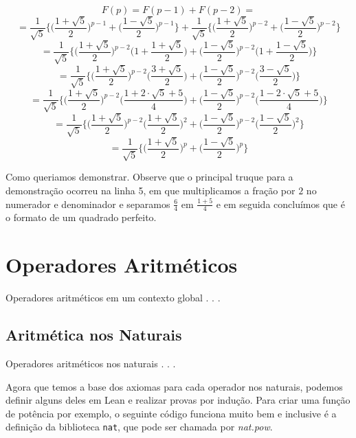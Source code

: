 \begin{center}
    \[ F(p) = F(p-1) + F(p-2) = \]
    \[ = \frac{1}{\sqrt{5}}\bigg \{ \Big (\frac{1+\sqrt{5}}{2} \Big )^{p-1} + \Big (\frac{1-\sqrt{5}}{2}\Big )^{p-1}\bigg \} + \frac{1}{\sqrt{5}}\bigg \{ \Big (\frac{1+\sqrt{5}}{2} \Big )^{p-2} + \Big (\frac{1-\sqrt{5}}{2}\Big )^{p-2}\bigg \}\]
    \[ = \frac{1}{\sqrt{5}}\bigg \{ \Big (\frac{1+\sqrt{5}}{2} \Big )^{p-2} \Big( 1 + \frac{1+\sqrt{5}}{2}\Big) + \Big (\frac{1-\sqrt{5}}{2}\Big )^{p-2} \Big( 1 +\frac{1 - \sqrt{5}}{2}\Big)\bigg \}\]
    \[ = \frac{1}{\sqrt{5}}\bigg \{ \Big (\frac{1+\sqrt{5}}{2} \Big )^{p-2} \Big( \frac{3+\sqrt{5}}{2}\Big) + \Big (\frac{1-\sqrt{5}}{2}\Big )^{p-2} \Big( \frac{3 - \sqrt{5}}{2}\Big)\bigg \}\]
    \[ = \frac{1}{\sqrt{5}}\bigg \{ \Big (\frac{1+\sqrt{5}}{2} \Big )^{p-2} \Big( \frac{1+2\cdot \sqrt{5} + 5}{4}\Big) + \Big (\frac{1-\sqrt{5}}{2}\Big )^{p-2} \Big( \frac{1 - 2\cdot \sqrt{5} +5}{4}\Big)\bigg \}\]
    \[ = \frac{1}{\sqrt{5}}\bigg \{ \Big (\frac{1+\sqrt{5}}{2} \Big )^{p-2} \Big( \frac{1+\sqrt{5}}{2}\Big)^2 + \Big (\frac{1-\sqrt{5}}{2}\Big )^{p-2} \Big( \frac{1 - \sqrt{5}}{2}\Big)^2 \bigg \}\]
    \[ = \frac{1}{\sqrt{5}}\bigg \{ \Big (\frac{1+\sqrt{5}}{2} \Big )^p + \Big (\frac{1-\sqrt{5}}{2}\Big )^p\bigg \} \]
\end{center}
Como queriamos demonstrar. Observe que o principal truque para a demonstração ocorreu na linha 5, 
em que multiplicamos a fração por $2$ no numerador e denominador e separamos $\frac{6}{4}$ em $\frac{1+5}{4}$
e em seguida concluímos que é o formato de um quadrado perfeito.

\section{Operadores Aritméticos}

Operadores aritméticos em um contexto global . . .

\subsection{Aritmética nos Naturais}

Operadores aritméticos nos naturais . . .

Agora que temos a base dos axiomas para cada operador nos naturais, podemos definir alguns deles em Lean e realizar provas por indução. Para criar uma função de potência por exemplo, o seguinte código funciona muito bem e inclusive é a definição da biblioteca \lstinline{nat}, que pode ser chamada por \textit{nat.pow}.

